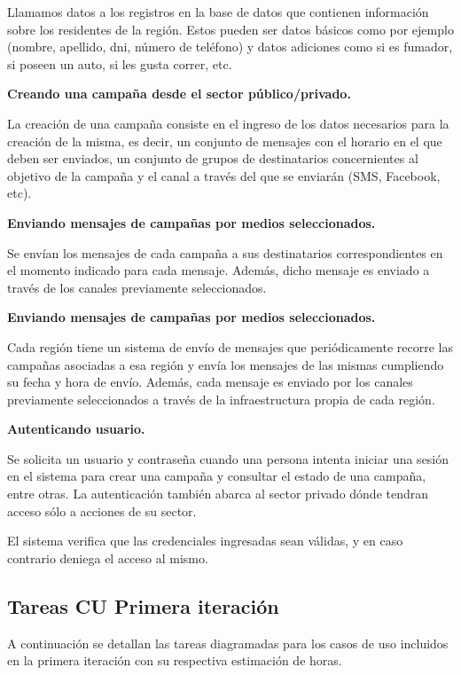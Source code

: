 \documentclass[a4paper, 10pt, twoside]{article}
\begin{document}
Llamamos datos a los registros en la base de datos que contienen información sobre los residentes de la región. Estos pueden ser datos básicos como por ejemplo (nombre, apellido, dni, número de teléfono) y datos adiciones como si es fumador, si poseen un auto, si les gusta correr, etc.

\textbf{Creando una campaña desde el sector público/privado.}

La creación de una campaña consiste en el ingreso de los datos necesarios para la creación de la misma, es decir, un conjunto de mensajes con el horario en el que deben ser enviados, un conjunto de grupos de destinatarios concernientes al objetivo de la campaña y el canal a través del que se enviarán (SMS, Facebook, etc).

\textbf{Enviando mensajes de campañas por medios seleccionados.}

Se envían los mensajes de cada campaña a sus destinatarios correspondientes en el momento indicado para cada mensaje. Además, dicho mensaje es enviado a través de los canales previamente seleccionados.

\textbf{Enviando mensajes de campañas por medios seleccionados.}

Cada región tiene un sistema de envío de mensajes que periódicamente recorre las campañas asociadas a esa región y envía los mensajes de las mismas cumpliendo su fecha y hora de envío. Además, cada mensaje es enviado por los canales previamente seleccionados a través de la infraestructura propia de cada región.

\textbf{Autenticando usuario.}

Se solicita un usuario y contraseña cuando una persona intenta iniciar una sesión en el sistema para crear una campaña y consultar el estado de una campaña, entre otras. La autenticación también abarca al sector privado dónde tendran acceso sólo a acciones de su sector.

El sistema verifica que las credenciales ingresadas sean válidas, y en caso contrario deniega el acceso al mismo.

\subsection{Tareas CU Primera iteración}
A continuación se detallan las tareas diagramadas para los casos de uso incluidos en la primera iteración con su respectiva estimación de horas.
\\
\end{document}
